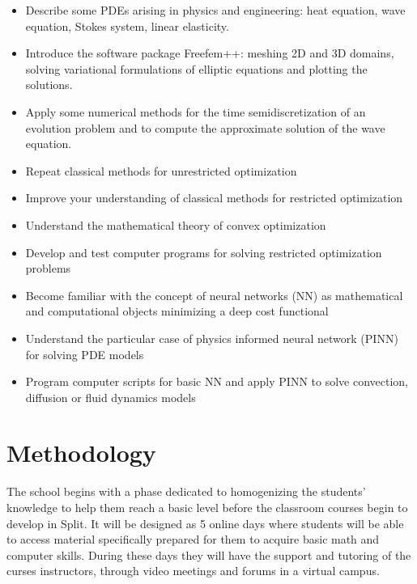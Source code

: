 \documentclass[letterpaper]{inzane_syllabus} %
\begin{document}
\begin{itemize}
  \item Describe some PDEs arising in physics and engineering: heat equation, wave equation, Stokes system, linear elasticity. 
  \item Introduce the software package Freefem++: meshing 2D and 3D domains, solving variational formulations of elliptic equations and plotting the solutions. 
  \item Apply some numerical methods for the time semidiscretization of an evolution problem and to compute the approximate solution of the wave equation.
  \item Repeat classical methods for unrestricted optimization
  \item Improve your understanding of classical methods for restricted optimization
  \item  Understand the mathematical theory of convex optimization
  \item  Develop and test computer programs for solving restricted optimization problems%
  \item Become familiar with the concept of  neural networks (NN) as mathematical and computational objects minimizing a deep cost functional
  \item Understand the particular case of physics informed neural network (PINN) for solving PDE models
  \item Program computer scripts for basic NN and apply PINN to solve convection, diffusion or fluid dynamics models

\end{itemize}


\vspace{0.5cm} 
\section{Methodology}

The school begins with a phase dedicated to homogenizing the students' knowledge to help them reach a basic level before the classroom courses begin to develop in Split. It will be designed as 5 online days where students will be able to access material specifically prepared for them to acquire basic math and computer skills. During these days they will have the support and tutoring of the curses instructors, through video meetings and forums in a virtual campus.
\end{document}
